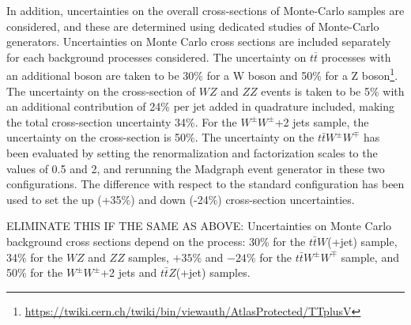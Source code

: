 
In addition, uncertainties on the overall cross-sections of Monte-Carlo samples are considered,
and these are determined using dedicated studies of Monte-Carlo generators.
Uncertainties on Monte Carlo cross sections are included separately for each background processes considered.
The uncertainty on $t \overline{t}$ processes with an additional boson are taken to be 30\% for a W boson 
and 50\% for a Z boson\footnote{\url{https://twiki.cern.ch/twiki/bin/viewauth/AtlasProtected/TTplusV}}.
The uncertainty on the cross-section of $WZ$ and $ZZ$ events is taken to be 5\% with an additional contribution of 24\% per jet added in quadrature included, making the total cross-section uncertainty 34\%.
For the $W^{\pm}W^{\pm}$+2 jets sample, the uncertainty on the cross-section is 50\%.
The uncertainty on the $t\bar{t}W^{\pm}W^{\mp}$ has been evaluated by setting the renormalization
and factorization scales to the values of 0.5 and 2, and rerunning the Madgraph event generator 
in these two configurations. 
The difference with respect to the standard configuration has been used to set the up
(+35\%) and down (-24\%) cross-section uncertainties.

ELIMINATE THIS IF THE SAME AS ABOVE:
Uncertainties on Monte Carlo background cross sections depend on the process: 
30\% for the $t\bar{t}W$(+jet) sample, 
34\% for the $WZ$ and $ZZ$ samples, 
$+35$\% and $-24$\% for the $t\bar{t}W^{\pm}W^{\mp}$ sample, 
and 50\% for the $W^{\pm}W^{\pm}$+2 jets and $t\bar{t}Z$(+jet) samples. 


